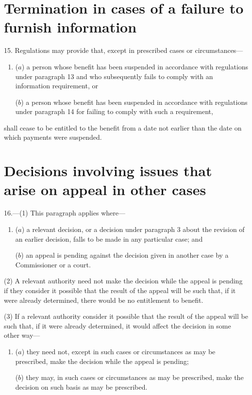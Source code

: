 \documentclass[12pt,a4paper]{article}
\begin{document}
\section*{Termination in cases of a failure to furnish information}

15. Regulations may provide that, except in prescribed cases or circumstances—
\begin{enumerate}\item[]
($a$) a person whose benefit has been suspended in accordance with regulations under paragraph 13 and who subsequently fails to comply with an information requirement, or

($b$) a person whose benefit has been suspended in accordance with regulations under paragraph 14 for failing to comply with such a requirement,
\end{enumerate}
shall cease to be entitled to the benefit from a date not earlier than the date on which payments were suspended.

\section*{Decisions involving issues that arise on appeal in other cases}

16.---(1) This paragraph applies where—
\begin{enumerate}\item[]
($a$) a relevant decision, or a decision under paragraph 3 about the revision of an earlier decision, falls to be made in any particular case; and

($b$) an appeal is pending against the decision given in another case by a Commissioner or a court.
\end{enumerate}

(2) A relevant authority need not make the decision while the appeal is pending if they consider it possible that the result of the appeal will be such that, if it were already determined, there would be no entitlement to benefit.

(3) If a relevant authority consider it possible that the result of the appeal will be such that, if it were already determined, it would affect the decision in some other way—
\begin{enumerate}\item[]
($a$) they need not, except in such cases or circumstances as may be prescribed, make the decision while the appeal is pending;

($b$) they may, in such cases or circumstances as may be prescribed, make the decision on such basis as may be prescribed.
\end{enumerate}
\end{document}
